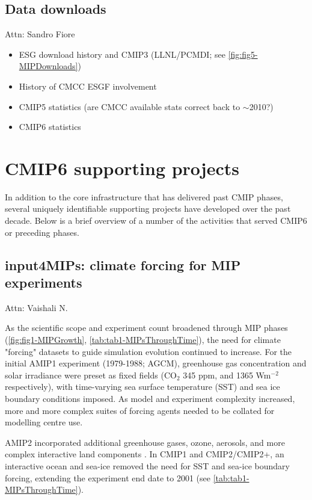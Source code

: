 \documentclass[gmd, preprint]{copernicus}
\def\cred#1{{\color{red}#1}}
\begin{document}
\subsection{Data downloads}
\label{sec:CMIPDataDownloads}
\cred{Attn: Sandro Fiore}
\cred{
\begin{itemize}
	\item ESG download history and CMIP3 (LLNL/PCMDI; see \autoref{fig:fig5-MIPDownloads})
    \item History of CMCC ESGF involvement
	\item CMIP5 statistics (are CMCC available stats correct back to $\sim$2010?)
	\item CMIP6 statistics
\end{itemize}
}


\section{CMIP6 supporting projects}
\label{sec:CMIP6SupportingProjects}
In addition to the core infrastructure that has delivered past CMIP phases, several uniquely identifiable supporting projects have developed over the past decade. Below is a brief overview of a number of the activities that served CMIP6 or preceding phases.


\subsection{input4MIPs: climate forcing for MIP experiments}
\label{sec:CMIP6SupportingProjects-input4MIPs}
\cred{Attn: Vaishali N.}

As the scientific scope and experiment count broadened through MIP phases (\autoref{fig:fig1-MIPGrowth}, \autoref{tab:tab1-MIPsThroughTime}), the need for climate "forcing" datasets to guide simulation evolution continued to increase. For the initial AMIP1  experiment (1979-1988; AGCM), greenhouse gas concentration and solar irradiance were preset as fixed fields (CO$_{2}$ 345 ppm, and 1365 Wm$^{-2}$ respectively), with time-varying sea surface temperature (SST) and sea ice boundary conditions imposed. As model and experiment complexity increased, more and more complex suites of forcing agents needed to be collated for modelling centre use.

AMIP2 incorporated additional greenhouse gases, ozone, aerosols, and more complex interactive land components \citep[e.g.,][]{gleckler_amip_1996-1,liang_pcmdi_1997}. In CMIP1 and CMIP2/CMIP2+, an interactive ocean and sea-ice removed the need for SST and sea-ice boundary forcing, extending the experiment end date to 2001 (see \autoref{tab:tab1-MIPsThroughTime}).
\end{document}
